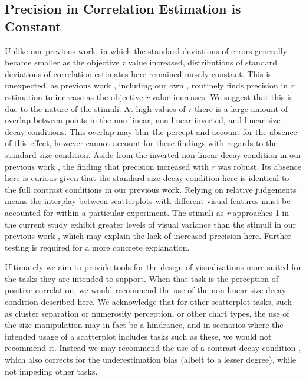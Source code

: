 \documentclass{vgtc}                          %
\begin{document}
\hypertarget{precision-in-correlation-estimation-is-constant}{%
\subsection{Precision in Correlation Estimation is Constant}\label{precision-in-correlation-estimation-is-constant}}

Unlike our previous work, in which the standard deviations of errors generally
became smaller as the objective \emph{r} value increased, distributions of standard
deviations of correlation estimates here remained mostly constant. This
is unexpected, as previous work \cite{rensink_2010, rensink_2012, rensink_2014, rensink_2017},
including our own \cite{strain_2023}, routinely finds precision
in \emph{r} estimation to increase as the objective \emph{r} value increases. We suggest that this
is due to the nature of the stimuli. At high values of \emph{r} there is a large amount
of overlap between points in the non-linear, non-linear inverted,
and linear size decay conditions. This overlap may blur the percept and
account for the absence of this effect, however cannot account for these findings
with regards to the standard size condition. Aside from the inverted non-linear decay condition in
our previous work \cite{strain_2023}, the finding that precision increased with \emph{r}
was robust. Its absence here is curious given that the standard size decay condition
here is identical to the full contrast conditions in our previous work.
Relying on relative judgements means the interplay between scatterplots with
different visual features must be accounted for within a particular experiment.
The stimuli as \emph{r} approaches 1 in the current study exhibit greater levels of
visual variance than the stimuli in our previous work \cite{strain_2023},
which may explain the lack of increased precision here. Further testing is required
for a more concrete explanation.

Ultimately we aim to provide tools for the design of visualizations more suited for the tasks
they are intended to support. When that task is the perception of positive correlation, we would
recommend the use of the non-linear size decay condition described here. We acknowledge that
for other scatterplot tasks, such as cluster separation or numerosity perception, or
other chart types, the use of the size manipulation may in fact be a hindrance, and in scenarios
where the intended usage of a scatterplot includes tasks such as these, we would not
recommend it. Instead we may recommend the use of a contrast decay condition
\cite{strain_2023}, which also corrects for the underestimation bias (albeit to a
lesser degree), while not impeding other tasks.
\end{document}
